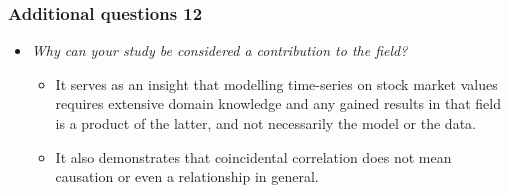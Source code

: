 \documentclass[aspectratio=169,classic]{uva-inf-presentation}
\begin{document}
\begin{frame}
\frametitle{Additional questions 12}
\begin{itemize}
    \item \textit{Why can your study be considered a contribution to the field?} \newline
    \begin{itemize}
        \item It serves as an insight that modelling time-series on stock market values requires extensive domain knowledge and any gained results in that field is a product of the latter, and not necessarily the model or the data.
        \item It also demonstrates that coincidental correlation does not mean causation or even a relationship in general.
    \end{itemize}
    
\end{itemize}
\end{frame} 

\end{document}
